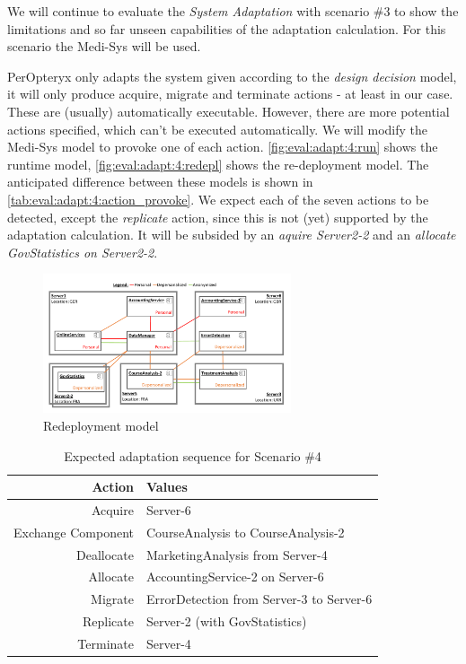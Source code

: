 We will continue to evaluate the \textit{System Adaptation} with scenario \#3 to show the limitations and so far unseen capabilities of the adaptation calculation. For this scenario the Medi-Sys will be used.

PerOpteryx only adapts the system given according to the \textit{design decision} model, it will only produce acquire, migrate and terminate actions - at least in our case. These are (usually) automatically executable. However, there are more potential actions specified, which can't be executed automatically. We will modify the Medi-Sys model to provoke one of each action. \autoref{fig:eval:adapt:4:run} shows the runtime model, \autoref{fig:eval:adapt:4:redepl} shows the re-deployment model. The anticipated difference between these models is shown in \autoref{tab:eval:adapt:4:action_provoke}. We expect each of the seven actions to be detected, except the \textit{replicate} action, since this is not (yet) supported by the adaptation calculation. It will be subsided by an \textit{aquire Server2-2} and an \textit{allocate GovStatistics on Server2-2}.

\begin{figure}[h]
	\centering
	\includegraphics[trim = 5mm 5mm 10mm 10mm, clip, width=0.65\textwidth]{graphs/medSystem_adap_calc_all_redepl}
	\caption{Redeployment model}
	\label{fig:eval:adapt:4:redepl}
\end{figure}

\begin{table}[h]
	\centering
	\begin{tabular}{r | l }
		\hline
		\textbf{Action} & \textbf{Values}\\
		\hline
		Acquire & Server-6\\
		Exchange Component & CourseAnalysis to CourseAnalysis-2\\
		Deallocate & MarketingAnalysis from Server-4\\
		Allocate & AccountingService-2 on Server-6\\
		Migrate & ErrorDetection from Server-3 to Server-6\\
		Replicate & Server-2 (with GovStatistics)\\
		Terminate & Server-4\\
		\hline
	\end{tabular}
	\caption{Expected adaptation sequence for Scenario \#4}
	\label{tab:eval:adapt:4:action_provoke}
\end{table}

